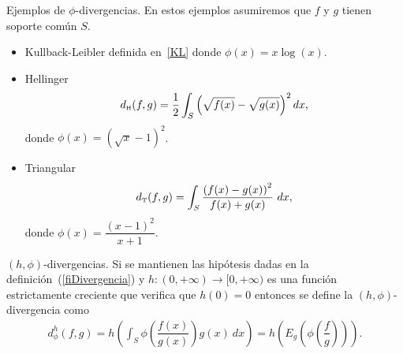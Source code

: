 \begin{example} Ejemplos de $\phi$-divergencias. En estos ejemplos asumiremos que $f$ y $g$ tienen soporte común $S$.
	\begin{itemize}
		\item Kullback-Leibler definida en~\eqref{KL} donde $\phi(x)=x \log(x)$.
		\item Hellinger
		\begin{align} 
		d_{\text{\tiny{H}}}(f,g)=\dfrac{1}{2} \displaystyle \int_{S} \left(\sqrt{f(x)}-\sqrt{g(x)}\right)^2 dx,
		\end{align}
		donde $\phi(x)=\left(\sqrt{x}-1\right)^2$.
		\item Triangular
		\begin{align}
		\label{triangular}
		d_{\text{\tiny{T}}}(f,g)=\displaystyle \int_{S} \dfrac{\left(f(x)-g(x)\right)^2}{f(x)+g(x)} \ dx,
		\end{align}
		donde $\phi(x)=\dfrac{\left(x-1 \right)^2}{x+1}$.
	\end{itemize}
\end{example}

\begin{definition} $(h,\phi)$-divergencias.
	\label{hfiDivergencia}
	Si se mantienen las hipótesis dadas en la definición~(\ref{fiDivergencia}) y $h: (0,+\infty)\rightarrow [0,+\infty)$ es una función estrictamente creciente que verifica que $h(0)=0$ entonces se define la $(h,\phi)$-divergencia como
	\begin{align}
	d^h_{\phi}(f, g)=h\left(\int_{S} \phi\left(\dfrac{f(x)}{g(x)}\right) g(x) \ dx\right)=h\left(E_{g}\left(\phi\left(\dfrac{f}{g}\right)\right)\right).
	\end{align}
\end{definition}

